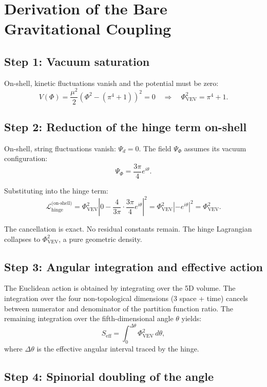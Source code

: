 \documentclass[12pt]{article}
\begin{document}
\section{Derivation of the Bare Gravitational Coupling}

\subsection{Step 1: Vacuum saturation}

On-shell, kinetic fluctuations vanish and the potential must be zero:
\[
V(\Phi) = \frac{\mu^2}{2} \left( \Phi^2 - (\pi^4 + 1) \right)^2 = 0 \quad\Rightarrow\quad \Phi_{\text{VEV}}^2 = \pi^4 + 1.
\]

\subsection{Step 2: Reduction of the hinge term on-shell}

On-shell, string fluctuations vanish: \(\Psi_d = 0\). The field \(\Psi_\Phi\) assumes its vacuum configuration:
\[
\Psi_\Phi = \frac{3\pi}{4} e^{i\theta}.
\]

Substituting into the hinge term:
\[
\mathcal{L}_{\text{hinge}}^{\text{(on-shell)}} = \Phi_{\text{VEV}}^2 \left| 0 - \frac{4}{3\pi} \cdot \frac{3\pi}{4} e^{i\theta} \right|^2 = \Phi_{\text{VEV}}^2 \left| - e^{i\theta} \right|^2 = \Phi_{\text{VEV}}^2.
\]

The cancellation is exact. No residual constants remain. The hinge Lagrangian collapses to \(\Phi_{\text{VEV}}^2\), a pure geometric density.

\subsection{Step 3: Angular integration and effective action}

The Euclidean action is obtained by integrating over the 5D volume. The integration over the four non-topological dimensions (3 space + time) cancels between numerator and denominator of the partition function ratio. The remaining integration over the fifth-dimensional angle \(\theta\) yields:
\[
S_{\text{eff}} = \int_{0}^{\Delta\theta} \Phi_{\text{VEV}}^2 \, d\theta,
\]
where \(\Delta\theta\) is the effective angular interval traced by the hinge.

\subsection{Step 4: Spinorial doubling of the angle}
\end{document}
